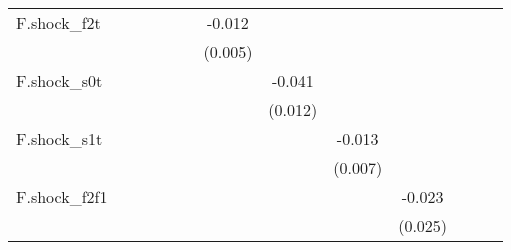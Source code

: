 {\begin{tabular}{l*{12}{c}}
\addlinespace
F.shock\_f2t &                     &                     &                     &                     &                     &      -0.012\sym{**} &                     &                     &                     &                     &                     &                     \\
            &                     &                     &                     &                     &                     &     (0.005)         &                     &                     &                     &                     &                     &                     \\
\addlinespace
F.shock\_s0t &                     &                     &                     &                     &                     &                     &      -0.041\sym{***}&                     &                     &                     &                     &                     \\
            &                     &                     &                     &                     &                     &                     &     (0.012)         &                     &                     &                     &                     &                     \\
\addlinespace
F.shock\_s1t &                     &                     &                     &                     &                     &                     &                     &      -0.013\sym{*}  &                     &                     &                     &                     \\
            &                     &                     &                     &                     &                     &                     &                     &     (0.007)         &                     &                     &                     &                     \\
\addlinespace
F.shock\_f2f1&                     &                     &                     &                     &                     &                     &                     &                     &      -0.023         &                     &                     &                     \\
            &                     &                     &                     &                     &                     &                     &                     &                     &     (0.025)         &                     &                     &                     \\

\end{tabular}}
